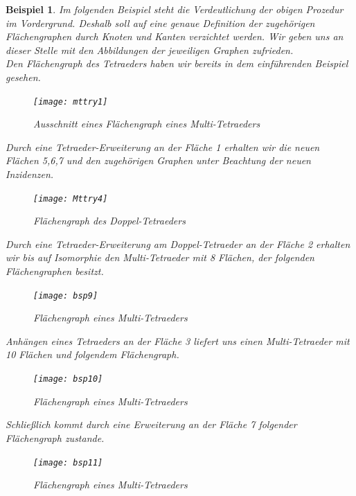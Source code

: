 \documentclass[12pt,titlepage,twoside,cleardoublepage]{article}
\theoremstyle{nummermitklammern}
\newtheorem{bsp}[temp]{Beispiel}
\newtheorem{bsp}[zahl]{Beispiel}
\numberwithin{equation}{section}
\begin{document}
\begin{bsp}
Im folgenden Beispiel steht die Verdeutlichung der obigen Prozedur im Vordergrund. Deshalb soll auf eine genaue Definition der zugehörigen Flächengraphen durch Knoten und Kanten verzichtet werden. Wir geben uns an dieser Stelle mit den Abbildungen der jeweiligen Graphen zufrieden. \\
Den Flächengraph des Tetraeders haben wir bereits in dem einführenden Beispiel gesehen.
\begin{figure}[H]
\begin{center}
\texttt{[image: mttry1]}

\end{center}
\caption{Ausschnitt eines Flächengraph eines Multi-Tetraeders}
\end{figure}
Durch eine Tetraeder-Erweiterung an der Fläche 1 erhalten wir die neuen Flächen 5,6,7 und den zugehörigen Graphen unter Beachtung der neuen Inzidenzen.
\begin{figure}[H]
\begin{center}
\texttt{[image: Mttry4]}
\end{center}
\caption{Flächengraph des Doppel-Tetraeders}
\end{figure}
Durch eine Tetraeder-Erweiterung am Doppel-Tetraeder an der Fläche 2 erhalten wir bis auf Isomorphie den Multi-Tetraeder mit 8 Flächen, der folgenden Flächengraphen besitzt. 
\begin{figure}[H]
\begin{center}
\texttt{[image: bsp9]}
\end{center}
\caption{Flächengraph eines Multi-Tetraeders}
\end{figure}
Anhängen eines Tetraeders an der Fläche 3 liefert uns einen Multi-Tetraeder mit 10 Flächen und folgendem Flächengraph.
\begin{figure}[H]
\begin{center}
\texttt{[image: bsp10]}
\end{center}
\caption{Flächengraph eines Multi-Tetraeders}
\end{figure}
Schließlich kommt durch eine Erweiterung an der Fläche 7 folgender Flächengraph zustande.
\begin{figure}[H]
\begin{center}
\texttt{[image: bsp11]}
\end{center}
\caption{Flächengraph eines Multi-Tetraeders}
\end{figure}
\end{bsp}
\end{document}
